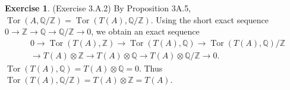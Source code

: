 \documentclass[12pt, psamsfonts]{amsart}
\theoremstyle{definition}
\newtheorem*{exer}{Exercise}
\theoremstyle{remark}
\DeclareMathOperator{\Tor}{Tor}
\numberwithin{equation}{section}
\begin{document}
\begin{exer}{(Exercise 3.A.2)}
  By Proposition 3A.5, $\Tor(A, \mathbb{Q} / \mathbb{Z}) = \Tor(T(A), \mathbb{Q} / \mathbb{Z})$.
  Using the short exact sequence $0 \rightarrow \mathbb{Z} \rightarrow \mathbb{Q} \rightarrow \mathbb{Q} / \mathbb{Z} \rightarrow 0$, we obtain an exact sequence
  \begin{align*}
    &0 \rightarrow \Tor(T(A), \mathbb{Z}) \rightarrow \Tor(T(A), \mathbb{Q}) \rightarrow \Tor(T(A), \mathbb{Q}) / \mathbb{Z} \\
    &\rightarrow T(A) \otimes \mathbb{Z} \rightarrow T(A) \otimes \mathbb{Q} \rightarrow T(A) \otimes \mathbb{Q} / \mathbb{Z} \rightarrow 0.
  \end{align*}
  $\Tor(T(A), \mathbb{Q}) = T(A) \otimes \mathbb{Q} = 0$.
  Thus $\Tor(T(A), \mathbb{Q} / \mathbb{Z}) = T(A) \otimes \mathbb{Z} = T(A)$.
\end{exer}
\end{document}

